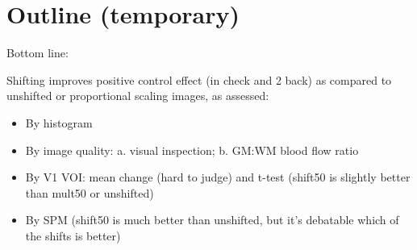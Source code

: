 \section{Outline (temporary)}
Bottom line:

Shifting improves positive control effect (in check and 2 back) as compared to unshifted or proportional scaling images, as assessed:
\begin{itemize}
\item By histogram
\item By image quality: a. visual inspection; b. GM:WM blood flow ratio
\item By V1 VOI: mean change (hard to judge) and t-test (shift50 is slightly better than mult50 or unshifted)
\item By SPM (shift50 is much better than unshifted, but it's debatable which of the shifts is better)
\end{itemize}
